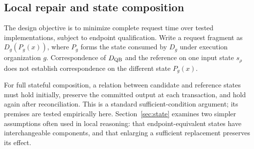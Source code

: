 \subsection{Local repair and state composition}
The design objective is to minimize complete request time over tested implementations, subject to endpoint qualification. Write a request fragment as $D_g(P_g(x))$, where $P_g$ forms the state consumed by $D_g$ under execution organization $g$. Correspondence of $D_{\mathrm{QB}}$ and the reference on one input state $s_\rho$ does not establish correspondence on the different state $P_g(x)$.

For full stateful composition, a relation between candidate and reference states must hold initially, preserve the committed output at each transaction, and hold again after reconciliation. This is a standard sufficient-condition argument; its premises are tested empirically here. Section~\ref{sec:state} examines two simpler assumptions often used in local reasoning: that endpoint-equivalent states have interchangeable components, and that enlarging a sufficient replacement preserves its effect.
